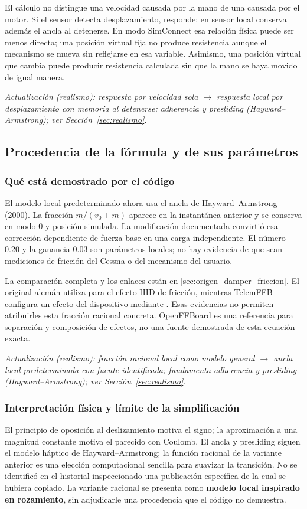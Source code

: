 \documentclass[11pt,a4paper]{article}
\newcommand{\code}[1]{\texttt{\detokenize{#1}}}
\begin{document}
El cálculo no distingue una velocidad causada por la mano de una causada por el motor. Si el sensor detecta desplazamiento, responde; en sensor local conserva además el ancla al detenerse. En modo SimConnect esa relación física puede ser menos directa; una posición virtual fija no produce resistencia aunque el mecanismo se mueva sin reflejarse en esa variable. Asimismo, una posición virtual que cambia puede producir resistencia calculada sin que la mano se haya movido de igual manera.

\textit{Actualización (realismo): respuesta por velocidad sola $\rightarrow$ respuesta local por desplazamiento con memoria al detenerse; adherencia y presliding (Hayward--Armstrong); ver Sección~\ref{sec:realismo}.}

\subsection{Procedencia de la fórmula y de sus parámetros}
\subsubsection{Qué está demostrado por el código}
El modelo local predeterminado ahora usa el ancla de Hayward--Armstrong (2000). La fracción $m/(v_0+m)$ aparece en la instantánea anterior y se conserva en modo 0 y posición simulada. La modificación documentada convirtió esa corrección dependiente de fuerza base en una carga independiente. El número 0.20 y la ganancia 0.03 son parámetros locales; no hay evidencia de que sean mediciones de fricción del Cessna o del mecanismo del usuario.

La comparación completa y los enlaces están en \ref{sec:origen_damper_friccion}. El original alemán utiliza \code{ConditionForceCalculator} para el efecto HID de fricción, mientras TelemFFB configura un efecto del dispositivo mediante \code{friction(force,force)}. Esas evidencias no permiten atribuirles esta fracción racional concreta. OpenFFBoard es una referencia para separación y composición de efectos, no una fuente demostrada de esta ecuación exacta.

\textit{Actualización (realismo): fracción racional local como modelo general $\rightarrow$ ancla local predeterminada con fuente identificada; fundamenta adherencia y presliding (Hayward--Armstrong); ver Sección~\ref{sec:realismo}.}

\subsubsection{Interpretación física y límite de la simplificación}
El principio de oposición al deslizamiento motiva el signo; la aproximación a una magnitud constante motiva el parecido con Coulomb. El ancla y presliding siguen el modelo háptico de Hayward--Armstrong; la función racional de la variante anterior es una elección computacional sencilla para suavizar la transición. No se identificó en el historial inspeccionado una publicación específica de la cual se hubiera copiado. La variante racional se presenta como \textbf{modelo local inspirado en rozamiento}, sin adjudicarle una procedencia que el código no demuestra.
\end{document}
